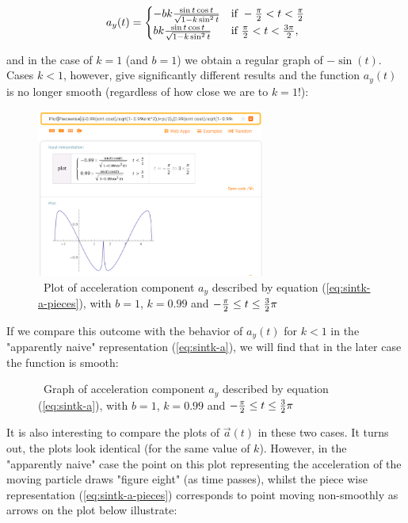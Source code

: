 \documentclass[journal]{IEEEtran}
\begin{document}
\begin{equation}
a_y(t)=
\begin{cases} 
- bk { {\sin t \cos t } \over  \sqrt{1 - k \sin ^2 t}} 
& \text{if } -{\pi \over 2} < t < {\pi \over 2} \\
bk { {\sin t \cos t } \over  \sqrt{1 - k \sin ^2 t}}
& \text{if } {\pi \over 2} < t < {3\pi \over 2} ,
\end{cases}
\label{eq:sintk-a-pieces}
\end{equation}

and in the case of $k=1$ (and $b=1$) we obtain a regular graph of $-\sin(t)$. Cases $k<1$, however, give significantly different results and the function $a_y(t)$ is no longer smooth (regardless of how close we are to $k=1$!):
%
\begin{figure}[H]
\includegraphics[width=7.5cm]{sintk-accel-pieces}
\caption{\ Plot of acceleration component $a_y$ described by equation (\ref{eq:sintk-a-pieces}), with $b=1$, $k=0.99$ and $ - { \pi \over 2 }  \leq t \leq { 3 \over 2 } \pi $ \bigskip}
\centering
\label{fig:sintk-accel-pieces}
\end{figure}


If we compare this outcome with the behavior of $a_y(t)$ for $k<1$ in the "apparently naive" representation (\ref{eq:sintk-a}), we will find that in the later case the function is smooth:

\begin{figure}[H]
\caption{\ Graph of acceleration component $a_y$ described by equation (\ref{eq:sintk-a}), with $b=1$, $k=0.99$ and $ - { \pi \over 2 }  \leq t \leq { 3 \over 2 } \pi $ \bigskip}
\centering
\label{fig:sintk-accel-naive}
\end{figure}

It is also interesting to compare the plots of $\vec{a}(t)$ in these two cases. It turns out, the plots look identical (for the same value of $k$). However, in the "apparently naive" case the point on this plot representing the acceleration of the moving particle draws "figure eight" (as time passes), whilst the piece wise representation (\ref{eq:sintk-a-pieces}) corresponds to point moving non-smoothly as arrows on the plot below illustrate:
\end{document}
